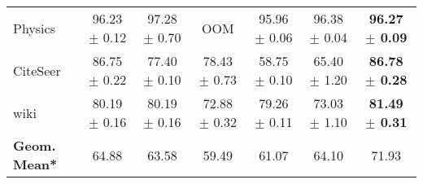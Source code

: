 \begin{table}[t]
\begin{sc}
{\begin{tabular}{@{}l|cccccc@{}}
Physics & 96.23 $\pm$ 0.12 & 97.28 $\pm$ 0.70 & OOM & 95.96 $\pm$ 0.06 & 96.38 $\pm$ 0.04 & \textbf{96.27 $\pm$ 0.09} \\
CiteSeer & 86.75 $\pm$ 0.22 & 77.40 $\pm$ 0.10 & 78.43 $\pm$ 0.73 & 58.75 $\pm$ 0.10 & 65.40 $\pm$ 1.20 & \textbf{86.78 $\pm$ 0.28} \\
wiki & 80.19 $\pm$ 0.16 & 80.19 $\pm$ 0.16 & 72.88 $\pm$ 0.32 & 79.26 $\pm$ 0.11 & 73.03 $\pm$ 1.10 & \textbf{81.49 $\pm$ 0.31} \\
\bottomrule
\rowcolor[HTML]{EFEFEF} 
\textbf{Geom. Mean*}	 & 64.88 & 63.58 & 59.49 & 61.07  & 64.10 & 71.93\\
\end{tabular}
}
\end{sc}
\end{table}